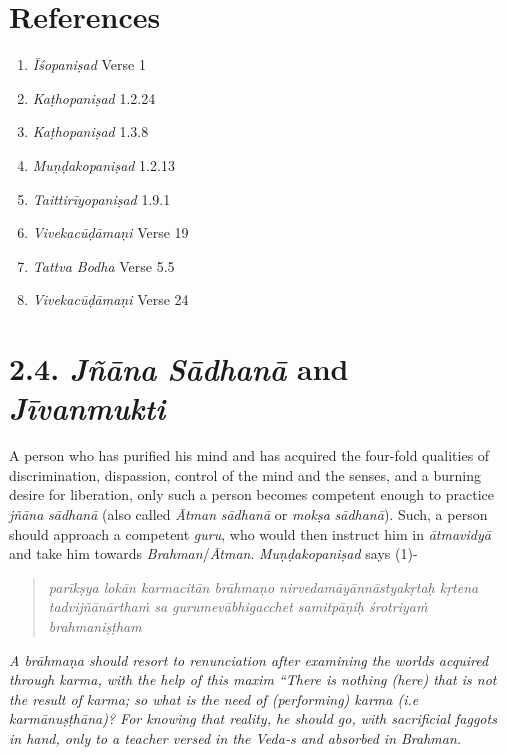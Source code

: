 \section*{References}

\begin{enumerate}
\itemsep=0pt
\item
  \emph{Īśopaniṣad} Verse 1
\item
  \emph{Kaṭhopaniṣad} 1.2.24
\item
  \emph{Kaṭhopaniṣad} 1.3.8
\item
  \emph{Muṇḍakopaniṣad} 1.2.13
\item
  \emph{Taittirīyopaniṣad} 1.9.1
\item
  \emph{Vivekacūḍāmaṇi} Verse 19
\item
  \emph{Tattva Bodha} Verse 5.5
\item
  \emph{Vivekacūḍāmaṇi} Verse 24
\end{enumerate}
\newpage

\section*{2.4. \emph{Jñāna} \emph{Sādhanā} and \emph{Jīvanmukti}}

A person who has purified his mind and has acquired the four-fold qualities of discrimination, dispassion, control of the mind and the senses, and a burning desire for liberation, only such a person becomes competent enough to practice \emph{jñāna} \emph{sādhanā} (also called \emph{Ātman} \emph{sādhanā} or \emph{mokṣa} \emph{sādhanā}). Such, a person should approach a competent \emph{guru}, who would then instruct him in \emph{ātmavidyā} and take him towards \emph{Brahman}/\emph{Ātman}. \emph{Muṇḍakopaniṣad} says (1)-

\begin{verse}
\emph{parīkṣya lokān karmacitān brāhmaṇo nirvedamāyānnāstyakṛtaḥ kṛtena }\\
\emph{tadvijñānārthaṁ sa gurumevābhigacchet samitpāṇiḥ śrotriyaṁ brahmaniṣṭham }
\end{verse}

\emph{A brāhmaṇa should resort to renunciation after examining the worlds acquired through karma, with the help of this maxim ``There is nothing (here) that is not the result of karma; so what is the need of (performing) karma (i.e karmānuṣṭhāna)? For knowing that reality, he should go, with sacrificial faggots in hand, only to a teacher versed in the Veda-s and absorbed in Brahman.}


